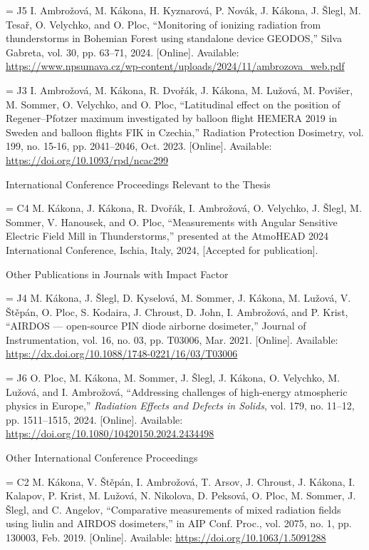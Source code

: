 \bib[j5] = {J5} I. Ambrožová, M. Kákona, H. Kyznarová, P. Novák, J. Kákona, J. Šlegl, M. Tesař, O. Velychko, and O. Ploc, “Monitoring of ionizing radiation from thunderstorms in Bohemian Forest using standalone device GEODOS,” Silva Gabreta, vol. 30, pp. 63–71, 2024. [Online]. Available: \url{https://www.npsumava.cz/wp-content/uploads/2024/11/ambrozova_web.pdf}

\bib[j3] = {J3} I. Ambrožová, M. Kákona, R. Dvořák, J. Kákona, M. Lužová, M. Povišer, M. Sommer, O. Velychko, and O. Ploc, “Latitudinal effect on the position of Regener–Pfotzer maximum investigated by balloon flight HEMERA 2019 in Sweden and balloon flights FIK in Czechia,” Radiation Protection Dosimetry, vol. 199, no. 15-16, pp. 2041–2046, Oct. 2023. [Online]. Available: \url{https://doi.org/10.1093/rpd/ncac299}

\secc International Conference Proceedings Relevant to the Thesis

\bib[c4] = {C4} M. Kákona, J. Kákona, R. Dvořák, I. Ambrožová, O. Velychko, J. Šlegl, M. Sommer, V. Hanousek, and O. Ploc, “Measurements with Angular Sensitive Electric Field Mill in Thunderstorms,” presented at the AtmoHEAD 2024 International Conference, Ischia, Italy, 2024, [Accepted for publication].


\secc Other Publications in Journals with Impact Factor

\bib[j4] = {J4} M. Kákona, J. Šlegl, D. Kyselová, M. Sommer, J. Kákona, M. Lužová, V. Štěpán, O. Ploc, S. Kodaira, J. Chroust, D. John, I. Ambrožová, and P. Krist, “AIRDOS — open-source PIN diode airborne dosimeter,” Journal of Instrumentation, vol. 16, no. 03, pp. T03006, Mar. 2021. [Online]. Available: \url{https://dx.doi.org/10.1088/1748-0221/16/03/T03006}

\bib[j6] = {J6} O. Ploc, M. Kákona, M. Sommer, J. Šlegl, J. Kákona, O. Velychko, M. Lužová, and I. Ambrožová, 
“Addressing challenges of high-energy atmospheric physics in Europe,” 
\textit{Radiation Effects and Defects in Solids}, vol. 179, no. 11–12, pp. 1511–1515, 2024. 
[Online]. Available: \url{https://doi.org/10.1080/10420150.2024.2434498}


\secc Other International Conference Proceedings

\bib[c2] = {C2} M. Kákona, V. Štěpán, I. Ambrožová, T. Arsov, J. Chroust, J. Kákona, I. Kalapov, P. Krist, M. Lužová, N. Nikolova, D. Peksová, O. Ploc, M. Sommer, J. Šlegl, and C. Angelov, “Comparative measurements of mixed radiation fields using liulin and AIRDOS dosimeters,” in AIP Conf. Proc., vol. 2075, no. 1, pp. 130003, Feb. 2019. [Online]. Available: \url{https://doi.org/10.1063/1.5091288}


